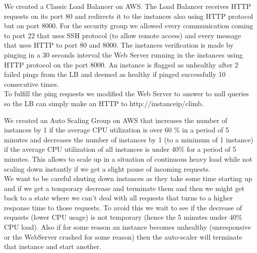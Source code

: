 \documentclass[times, 10pt,twocolumn]{article}
\begin{document}
   We created a Classic Load Balancer on AWS. The Load Balancer receives HTTP
   requests on its port 80 and redirects it to the instances also using HTTP
   protocol but on port 8000. For the security group we allowed every communication
   coming to port 22 that uses SSH protocol (to allow remote access) and every
   message that uses HTTP to port 80 and 8000. The instances verification is made 
   by pinging in a 30 seconds interval the Web Server running in the instances 
   using HTTP protocol on the port 8000. An instance is flagged as unhealthy after
   2 failed pings from the LB and deemed as healthy if pinged successfully 10 consecutive 
   times.\\
   To fulfill the ping requests we modified the Web Server to answer to null queries
   so the LB can simply make an HTTP to http://instanceip/climb.
   
   We created an Auto Scaling Group on AWS that increases the number of instances by
   1 if the average CPU utilization is over 60 \% in a period of 5 minutes and
   decreases the number of instances by 1 (to a minimum of 1 instance) if the average CPU 
   utilization of all instances is under 40\% for a period of 5 minutes. This allows
   to scale up in a situation of continuous heavy load while not scaling down instantly
   if we get a slight pause of incoming requests. \\
   We want to be careful shuting down instances as they take some time starting up and if 
   we get a temporary decrease and terminate them and then we might get back to a state
   where we can't deal with all requests that turns to a higher response time to those 
   requests. To avoid this we wait to see if the decrease of requests (lower CPU usage)
   is not temporary (hence the 5 minutes under 40\% CPU load). Also if for some reason
   an instance becomes unhealthy (unresponsive or the WebServer crashed for some reason)
   then the auto-scaler will terminate that instance and start another.

\end{document}
